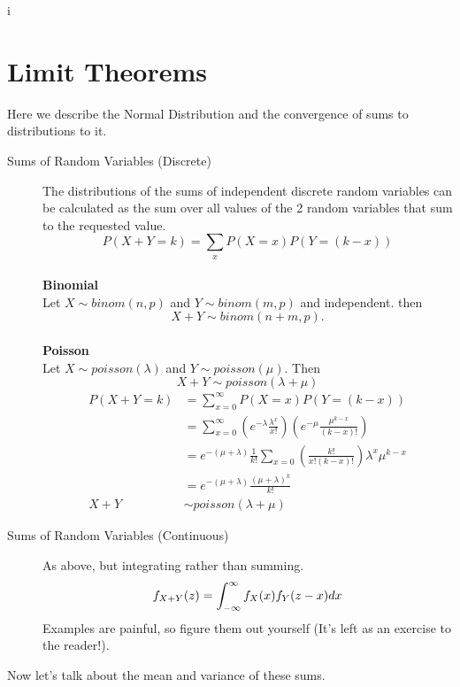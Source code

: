 i\documentclass[10pt]{article}
\begin{document}
\section{Limit Theorems}
Here we describe the Normal Distribution and the convergence of sums to distributions to it.

\begin{description}
    \item[Sums of Random Variables (Discrete)] The distributions of the sums of
        independent discrete random variables can be calculated as the sum over
        all values of the 2 random variables that sum to the requested value.
        \[ P(X + Y = k) = \sum_x P(X = x)P(Y = (k -x))  \]
        \\
        \textbf{Binomial} \\
        Let $X \sim binom(n,p)$ and $Y \sim binom(m,p)$ and independent. then \[X + Y \sim binom(n+m, p).\] \\
        \textbf{Poisson} \\
        Let $X \sim poisson(\lambda)$ and $Y \sim poisson(\mu)$. Then \[X + Y \sim poisson(\lambda + \mu) \]
        \begin{align*}
            P(X + Y = k) &= \sum_{x = 0}^{\infty} P(X = x)P(Y = (k -x)) \\
                         &= \sum_{x = 0}^{\infty} \left( e^{-\lambda}\frac{\lambda^x}{x!}\right)\left( e^{-\mu}\frac{\mu^{k-x}}{(k-x)!}\right) \\
                         &= e^{-(\mu+\lambda)} \frac{1}{k!}\sum_{x = 0} \left(\frac{k!}{x!(k-x)!}\right) \lambda^x \mu^{k-x} \\
                         &= e^{-(\mu+\lambda)} \frac{(\mu + \lambda)^k}{k!} \\
            X + Y &\sim poisson(\lambda + \mu)
        \end{align*}
    \item[Sums of Random Variables (Continuous)] As above, but integrating rather than summing.
        \[ f_{X+Y}(z) = \int_{-\infty}^{\infty} f_X(x)f_Y(z - x)dx \]
        Examples are painful, so figure them out yourself (It's left as an exercise to the reader!).
\end{description}
    Now let's talk about the mean and variance of these sums.
\end{document}
